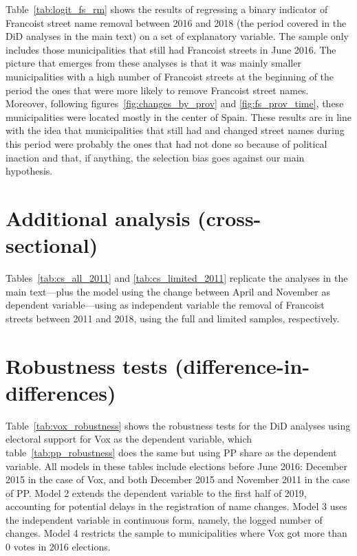 \documentclass[12pt, titlepage]{article}
\begin{document}
Table~\ref{tab:logit_fs_rm} shows the results of regressing a binary indicator of Francoist street name removal between 2016 and 2018 (the period covered in the DiD analyses in the main text) on a set of explanatory variable.
The sample only includes those municipalities that still had Francoist streets in June 2016.
The picture that emerges from these analyses is that it was mainly smaller municipalities with a high number of Francoist streets at the beginning of the period the ones that were more likely to remove Francoist street names.
Moreover, following figures~\ref{fig:changes_by_prov} and \ref{fig:fs_prov_time}, these municipalities were located mostly in the center of Spain.
These results are in line with the idea that municipalities that still had and changed street names during this period were probably the ones that had not done so because of political inaction and that, if anything, the selection bias goes against our main hypothesis.



\section{Additional analysis (cross-sectional)}



Tables~\ref{tab:cs_all_2011} and \ref{tab:cs_limited_2011} replicate the analyses in the main text---plus the model using the change between April and November as dependent variable---using as independent variable the removal of Francoist streets between 2011 and 2018, using the full and limited samples, respectively.




\section{Robustness tests (difference-in-differences)}

Table~\ref{tab:vox_robustness} shows the robustness tests for the DiD analyses using electoral support for Vox as the dependent variable, which table~\ref{tab:pp_robustness} does the same but using PP share as the dependent variable.
All models in these tables include elections before June 2016: December 2015 in the case of Vox, and both December 2015 and November 2011 in the case of PP.
Model 2 extends the dependent variable to the first half of 2019, accounting for potential delays in the registration of name changes.
Model 3 uses the independent variable in continuous form, namely, the logged number of changes.
Model 4 restricts the sample to municipalities where Vox got more than 0 votes in 2016 elections.



\end{document}
